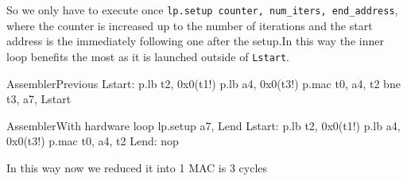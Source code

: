 So we only have to execute once \verb|lp.setup counter, num_iters, end_address|, where the counter is increased up to the number of iterations and the start address is the immediately following one after the setup.In this way the inner loop benefits the most as it is launched outside of \verb|Lstart|.

\begin{center}
\begin{minipage}[t]{0.45\textwidth}
\begin{MyCode}{Assembler}{Previous}
Lstart:
    p.lb t2, 0x0(t1!)
    p.lb a4, 0x0(t3!)
    p.mac t0, a4, t2
    bne t3, a7, Lstart
\end{MyCode}
\end{minipage}
\hfill
\begin{minipage}[t]{0.45\textwidth}
\begin{MyCode}{Assembler}{With hardware loop}
lp.setup a7, Lend
Lstart:
    p.lb t2, 0x0(t1!)
    p.lb a4, 0x0(t3!)
    p.mac t0, a4, t2
Lend: nop
\end{MyCode}
\end{minipage}
\end{center}
In this way now we reduced it into 1 MAC is 3 cycles

